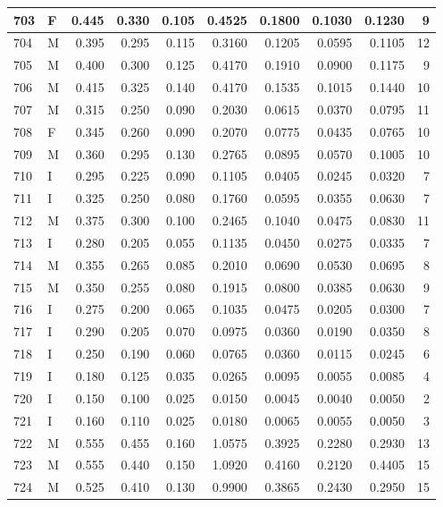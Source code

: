 \documentclass[9pt,twocolumn,twoside,]{pnas-new}
\begin{document}
\begin{tabular}{l|l|r|r|r|r|r|r|r|r}
\hline
703 & F & 0.445 & 0.330 & 0.105 & 0.4525 & 0.1800 & 0.1030 & 0.1230 & 9\\
\hline
704 & M & 0.395 & 0.295 & 0.115 & 0.3160 & 0.1205 & 0.0595 & 0.1105 & 12\\
\hline
705 & M & 0.400 & 0.300 & 0.125 & 0.4170 & 0.1910 & 0.0900 & 0.1175 & 9\\
\hline
706 & M & 0.415 & 0.325 & 0.140 & 0.4170 & 0.1535 & 0.1015 & 0.1440 & 10\\
\hline
707 & M & 0.315 & 0.250 & 0.090 & 0.2030 & 0.0615 & 0.0370 & 0.0795 & 11\\
\hline
708 & F & 0.345 & 0.260 & 0.090 & 0.2070 & 0.0775 & 0.0435 & 0.0765 & 10\\
\hline
709 & M & 0.360 & 0.295 & 0.130 & 0.2765 & 0.0895 & 0.0570 & 0.1005 & 10\\
\hline
710 & I & 0.295 & 0.225 & 0.090 & 0.1105 & 0.0405 & 0.0245 & 0.0320 & 7\\
\hline
711 & I & 0.325 & 0.250 & 0.080 & 0.1760 & 0.0595 & 0.0355 & 0.0630 & 7\\
\hline
712 & M & 0.375 & 0.300 & 0.100 & 0.2465 & 0.1040 & 0.0475 & 0.0830 & 11\\
\hline
713 & I & 0.280 & 0.205 & 0.055 & 0.1135 & 0.0450 & 0.0275 & 0.0335 & 7\\
\hline
714 & M & 0.355 & 0.265 & 0.085 & 0.2010 & 0.0690 & 0.0530 & 0.0695 & 8\\
\hline
715 & M & 0.350 & 0.255 & 0.080 & 0.1915 & 0.0800 & 0.0385 & 0.0630 & 9\\
\hline
716 & I & 0.275 & 0.200 & 0.065 & 0.1035 & 0.0475 & 0.0205 & 0.0300 & 7\\
\hline
717 & I & 0.290 & 0.205 & 0.070 & 0.0975 & 0.0360 & 0.0190 & 0.0350 & 8\\
\hline
718 & I & 0.250 & 0.190 & 0.060 & 0.0765 & 0.0360 & 0.0115 & 0.0245 & 6\\
\hline
719 & I & 0.180 & 0.125 & 0.035 & 0.0265 & 0.0095 & 0.0055 & 0.0085 & 4\\
\hline
720 & I & 0.150 & 0.100 & 0.025 & 0.0150 & 0.0045 & 0.0040 & 0.0050 & 2\\
\hline
721 & I & 0.160 & 0.110 & 0.025 & 0.0180 & 0.0065 & 0.0055 & 0.0050 & 3\\
\hline
722 & M & 0.555 & 0.455 & 0.160 & 1.0575 & 0.3925 & 0.2280 & 0.2930 & 13\\
\hline
723 & M & 0.555 & 0.440 & 0.150 & 1.0920 & 0.4160 & 0.2120 & 0.4405 & 15\\
\hline
724 & M & 0.525 & 0.410 & 0.130 & 0.9900 & 0.3865 & 0.2430 & 0.2950 & 15\\

\end{tabular}
\end{document}
